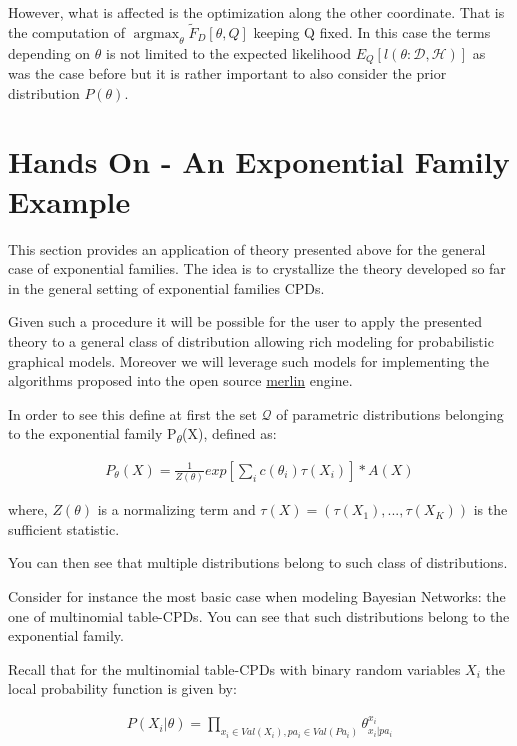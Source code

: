 \documentclass[11pt]{article}
\begin{document}
\begin{article}
However, what is affected is the optimization along the other
coordinate. That is the computation of
\(\operatorname*{argmax}_{\theta} \tilde{F}_D[\theta, Q]\) keeping Q
fixed. In this case the terms depending on \(\theta\) is not limited to
the expected likelihood \(E_Q[l (\theta: \mathscr{D}, \mathscr{H})]\)
as was the case before but it is rather important to also consider
the prior distribution \(P(\theta)\).





\newpage

\section{Hands On - An Exponential Family Example}
\label{examples}
This section provides an application of theory presented above for
the general case of exponential families. The idea is to
crystallize the theory developed so far in the general setting of
exponential families CPDs.

Given such a procedure it will be possible for the user to apply
the presented theory to a general class of distribution allowing
rich modeling for probabilistic graphical models. Moreover we will
leverage such models for implementing the algorithms proposed into
the open source \href{https://github.com/radum2275/merlin}{merlin} engine. 

In order to see this define at first the set \(\mathscr{Q}\) of
parametric distributions belonging to the exponential family
P\textsubscript{\(\theta\)}(X), defined as:

\begin{align} \label{eq:exponential-family}
P_{\theta}(X) = \frac{1}{Z(\theta)} exp[\sum_i c(\theta_i)\tau(X_i)] * A(X)
\end{align}

where, \(Z(\theta)\) is a normalizing term and \(\tau(X) = (\tau(X_1),
  ..., \tau(X_K))\) is the sufficient statistic.

You can then see that multiple distributions belong to such class
of distributions.

Consider for instance the most basic case when modeling Bayesian
Networks: the one of multinomial table-CPDs. You can see that
such distributions belong to the exponential family.

Recall that for the multinomial table-CPDs with binary random variables \(X_i\) the
local probability function is given by:

\begin{align} \label{eq:multinomial-cpd}
P(X_i|\theta) = \prod_{x_i \in Val(X_i), pa_i \in Val(Pa_i)} \theta_{x_i | pa_i}^{x_i}
\end{align}


\end{article}
\end{document}
